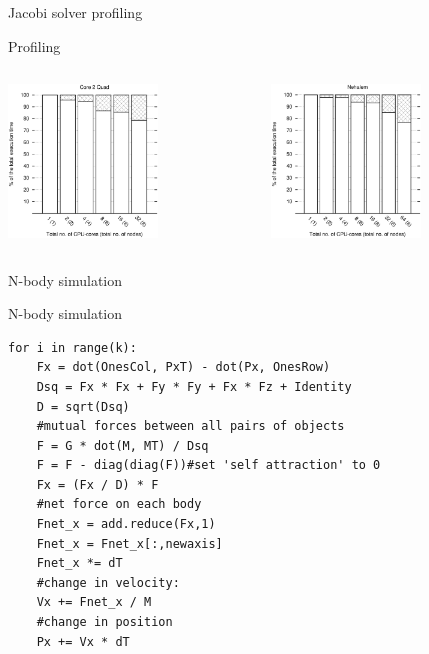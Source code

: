 \documentclass{beamer}
\begin{document}

\begin{frame}{Jacobi solver profiling}
\begin{center}
Profiling
\end{center}

\begin{columns}
  \begin{column}{0.5\textwidth}
  \begin{center}
    \includegraphics[width=150px]{../gfx/JacobiProfiling}
  \end{center}
  \end{column}
  \begin{column}{0.5\textwidth}
  \begin{center}
    \includegraphics[width=150px]{../gfx/JacobiProfiling2}
  \end{center}
  \end{column}
\end{columns}
\end{frame}


\begin{frame}[fragile]{N-body simulation}
\begin{center}
N-body simulation
\end{center}
\begin{scriptsize}
\begin{verbatim}
for i in range(k):
    Fx = dot(OnesCol, PxT) - dot(Px, OnesRow)
    Dsq = Fx * Fx + Fy * Fy + Fx * Fz + Identity
    D = sqrt(Dsq)
    #mutual forces between all pairs of objects
    F = G * dot(M, MT) / Dsq
    F = F - diag(diag(F))#set 'self attraction' to 0
    Fx = (Fx / D) * F
    #net force on each body
    Fnet_x = add.reduce(Fx,1)
    Fnet_x = Fnet_x[:,newaxis]
    Fnet_x *= dT
    #change in velocity:
    Vx += Fnet_x / M
    #change in position
    Px += Vx * dT
\end{verbatim}
\end{scriptsize}
\end{frame}
\end{document}
